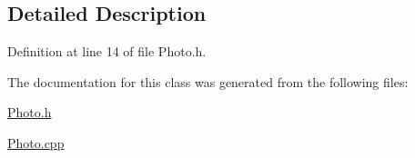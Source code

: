 \subsection{Detailed Description}


Definition at line 14 of file Photo.\+h.



The documentation for this class was generated from the following files\+:\begin{DoxyCompactItemize}
\item 
\mbox{\hyperlink{_photo_8h}{Photo.\+h}}\item 
\mbox{\hyperlink{_photo_8cpp}{Photo.\+cpp}}\end{DoxyCompactItemize}
